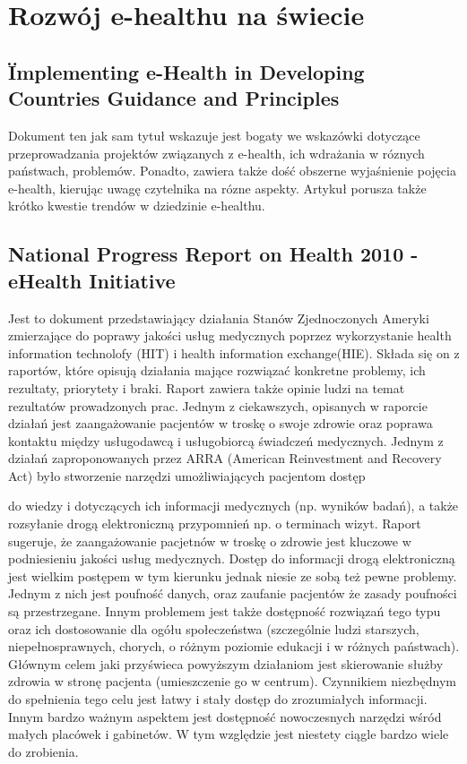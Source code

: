 \documentclass[a4paper,10pt]{article}
\begin{document}
\section {Rozwój e-healthu na świecie}
\subsection{\" Implementing e-Health in Developing Countries Guidance and Principles}
Dokument ten jak sam tytuł wskazuje jest bogaty we wskazówki dotyczące przeprowadzania projektów związanych z e-health, ich wdrażania w róznych państwach, problemów. Ponadto, zawiera także 
dość obszerne wyjaśnienie pojęcia e-health, kierując uwagę czytelnika na rózne aspekty. Artykuł porusza także krótko kwestie trendów w dziedzinie e-healthu.

\subsection{National Progress Report on Health 2010 - eHealth Initiative}
Jest to dokument przedstawiający działania Stanów Zjednoczonych Ameryki zmierzające do poprawy jakości usług medycznych poprzez wykorzystanie health information technolofy (HIT) i health information exchange(HIE). Składa się on z raportów, które opisują działania mające rozwiązać konkretne problemy, ich rezultaty, priorytety i braki. Raport zawiera także opinie ludzi na temat 
rezultatów prowadzonych prac. Jednym z ciekawszych, opisanych w raporcie działań jest zaangażowanie pacjentów w troskę o swoje zdrowie oraz poprawa kontaktu między
usługodawcą i usługobiorcą świadczeń medycznych. Jednym z działań zaproponowanych przez  ARRA (American Reinvestment and Recovery Act) było stworzenie narzędzi umożliwiających pacjentom dostęp 

do wiedzy  i dotyczących ich informacji medycznych (np. wyników badań), a także rozsyłanie drogą elektroniczną przypomnień np. o terminach wizyt. Raport sugeruje, że zaangażowanie pacjetnów
w troskę o zdrowie jest kluczowe w podniesieniu jakości usług medycznych. Dostęp do informacji drogą elektroniczną jest wielkim postępem w tym kierunku jednak niesie ze sobą też pewne problemy.
Jednym z nich jest poufność danych, oraz zaufanie pacjentów że zasady poufności są przestrzegane. Innym problemem jest także dostępność rozwiązań tego typu oraz ich dostosowanie dla ogółu 
społeczeństwa (szczególnie ludzi starszych, niepełnosprawnych, chorych, o różnym poziomie edukacji i w różnych państwach).   
Głównym celem jaki przyświeca powyższym działaniom jest skierowanie służby zdrowia w stronę pacjenta (umieszczenie go w centrum). Czynnikiem niezbędnym do spełnienia tego celu  jest łatwy
i stały dostęp do zrozumiałych informacji. Innym bardzo ważnym aspektem jest dostępność  nowoczesnych narzędzi wśród małych placówek i gabinetów. W tym względzie jest niestety ciągle bardzo wiele do zrobienia.
\end{document}
